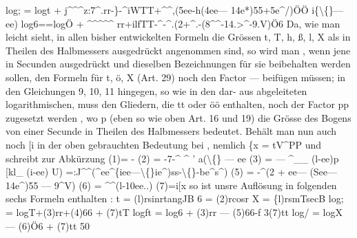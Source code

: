 \documentclass[12pt,a4paper]{article}
\begin{document}
log;  =  logt  +  j\^{}\^{}\^{}z:7\^{}.rr-\}-\^{}iWTT+\^{}\^{},(5ee-h(4ee--- 14e*)55+5e\^{}/)ÖÖ i\{\textbackslash\{\}---ee) log6==logÖ  +  \^{}\^{}\^{}\^{}\^{}  rr+ilfTT-\^{}-\^{}.(2+\^{}.-(8\^{}\^{}-14.>\^{}-9.V)Ö6 Da,  wie  man  leicht  sieht,  in  allen  bisher  entwickelten  Formeln  die  Grössen t,  T,  h,  ß,  l,  X  als  in  Theilen  des  Halbmessers  ausgedrückt  angenommen  sind,  so wird  man ,  wenn  jene  in  Secunden  ausgedrückt  und  dieselben  Bezeichnungen  für sie  beibehalten  werden  sollen,  den  Formeln  für  t,  ö,  X  (Art.  29)  noch  den  Factor ---  beifügen  müssen;  in  den  Gleichungen  9,  10,  11  hingegen,  so  wie  in  den  dar- aus abgeleiteten  logarithmischen,  muss  den  Gliedern,  die  tt  oder  öö  enthalten, noch  der  Factor  pp  zugesetzt  werden ,  wo  p  (eben  so  wie  oben  Art.  16  und  19) die  Grösse  des  Bogens  von  einer  Secunde  in  Theilen  des  Halbmessers  bedeutet. Behält  man  nun  auch  noch  [i  in  der  oben  gebrauchten  Bedeutung  bei ,  nemlich \{x  =  tV\^{}PP und  schreibt  zur  Abkürzung (1)=  - (2)  =  -7-\^{} \^{}    '  a(\textbackslash\{\}  ---  ee (3)  =  --- \^{}\_\_ (l-ee)p [kl\_ (i-ee) U)  =:J\^{}\^{}(\^{}ee\^{}\{iee---\textbackslash\{\}ie\^{})ss-\textbackslash\{\}-be\^{}s\^{}) (5)  =  -\^{}(2  +  ee--- (See--- 14e\^{})55  --- 9\^{}V) (6)  =  \^{}\^{}(l-10ee..) (7)=i[x so  ist  unsre  Auflösung  in  folgenden  sechs  Formeln  enthalten : t  =  (l)rsinrtangJB 6  =  (2)rcosr X  =  \{l)rsmTsecB log;  =  logT+(3)rr+(4)66  +  (7)tT logft  =  log6  +  (3)rr  --- (5)66-f  3(7)tt log/  =  logX  --- (6)Ö6  +  (7)tt 50
\end{document}
